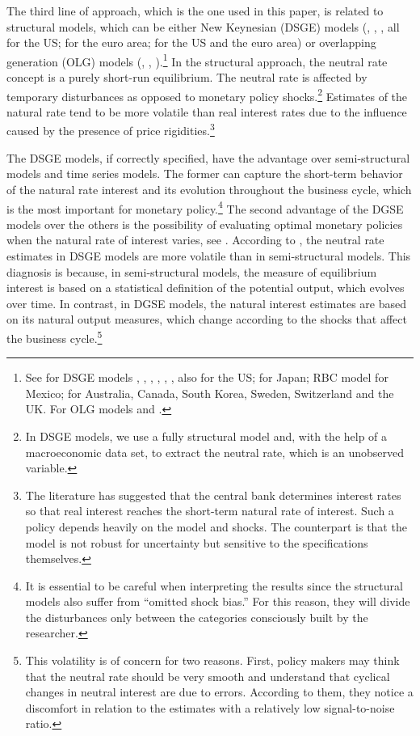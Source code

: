 \documentclass[12pt,oneside,a4paper]{article}
\begin{document}
The third line of approach, which is the one used in this paper, is related to structural models, which can be either New Keynesian (DSGE) models (\citet{Justiniano:2010}, \citet{Melosi:2015}, \citet{Curdia:2015}, \citet{DelNegro:2017} all for the US; \citet{Hristov:2016} for the euro area; \citet{Neri:2018} for the US and the euro area) or overlapping generation (OLG) models (\citet{Gagnon:2016}, \citet{Ferrero:2016}, \citet{Eggertsson:2019}).\footnote{See for DSGE models \citet{Orphanides:2002}, \citet{Edge:2008}, \citet{Lopez-Salido:2009}, \citet{Bjornland:2011}, \citet{Canzoneri:2015}, \citet{Del-Negro:2015}, also for the US; \citet{Okazaki:2018} for Japan;  \citet{Carrillo:2018} RBC model for Mexico; \citet{Grossman:2021} for Australia, Canada, South Korea, Sweden, Switzerland and the UK. For OLG models \citet{Kara:2016} and \citet{Papetti:2020}.} In the structural approach, the neutral rate concept is a purely short-run equilibrium. The neutral rate is affected by temporary disturbances as opposed to monetary policy shocks.\footnote{In DSGE models, we use a fully structural model and, with the help of a macroeconomic data set, to extract the neutral rate, which is an unobserved variable.} Estimates of the natural rate tend to be more volatile than real interest rates due to the influence caused by the presence of price rigidities.\footnote{The literature has suggested that the central bank determines interest rates so that real interest reaches the short-term natural rate of interest. Such a policy depends heavily on the model and shocks. The counterpart is that the model is not robust for uncertainty but sensitive to the specifications themselves.}

The DSGE models, if correctly specified, have the advantage over semi-structural models and time series models. The former can capture the short-term behavior of the natural rate interest and its evolution throughout the business cycle, which is the most important for monetary policy.\footnote{It is essential to be careful when interpreting the results since the structural models also suffer from “omitted shock bias.” For this reason, they will divide the disturbances only between the categories consciously built by the researcher.} The second advantage of the DGSE models over the others is the possibility of evaluating optimal monetary policies when the natural rate of interest  varies, see \citet{Gali:2019}. According to \citet{Brand:2018}, the neutral rate estimates in DSGE models are more volatile than in semi-structural models. This diagnosis is because, in semi-structural models, the measure of equilibrium interest is based on a statistical definition of the potential output, which evolves over time. In contrast, in DGSE models, the natural interest estimates are based on its natural output measures, which change according to the shocks that affect the business cycle.\footnote{This volatility is of concern for two reasons. First, policy makers may think that the neutral rate should be very smooth and understand that cyclical changes in neutral interest are due to errors. According to them, they notice a discomfort in relation to the estimates with a relatively low signal-to-noise ratio.}
\end{document}
